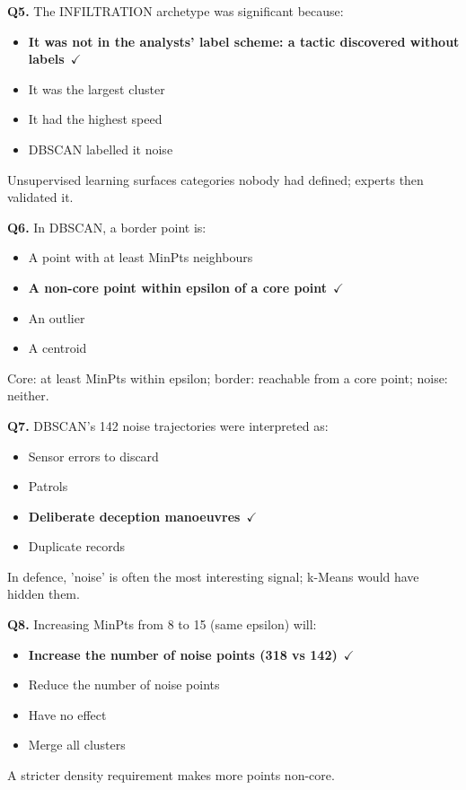 \documentclass[11pt]{article}
\begin{document}
{\noindent\textbf{Q5.} The INFILTRATION archetype was significant because:\begin{itemize}[leftmargin=2.2em,itemsep=0pt,topsep=1pt]\item[\textbf{A.}] \textbf{It was not in the analysts' label scheme: a tactic discovered without labels}~{\color{GrnN}$\checkmark$}\item[B.] It was the largest cluster\item[C.] It had the highest speed\item[D.] DBSCAN labelled it noise\end{itemize} Unsupervised learning surfaces categories nobody had defined; experts then validated it.\par\medskip

\noindent\textbf{Q6.} In DBSCAN, a border point is:\begin{itemize}[leftmargin=2.2em,itemsep=0pt,topsep=1pt]\item[A.] A point with at least MinPts neighbours\item[\textbf{B.}] \textbf{A non-core point within epsilon of a core point}~{\color{GrnN}$\checkmark$}\item[C.] An outlier\item[D.] A centroid\end{itemize} Core: at least MinPts within epsilon; border: reachable from a core point; noise: neither.\par\medskip

\noindent\textbf{Q7.} DBSCAN's 142 noise trajectories were interpreted as:\begin{itemize}[leftmargin=2.2em,itemsep=0pt,topsep=1pt]\item[A.] Sensor errors to discard\item[B.] Patrols\item[\textbf{C.}] \textbf{Deliberate deception manoeuvres}~{\color{GrnN}$\checkmark$}\item[D.] Duplicate records\end{itemize} In defence, 'noise' is often the most interesting signal; k-Means would have hidden them.\par\medskip

\noindent\textbf{Q8.} Increasing MinPts from 8 to 15 (same epsilon) will:\begin{itemize}[leftmargin=2.2em,itemsep=0pt,topsep=1pt]\item[\textbf{A.}] \textbf{Increase the number of noise points (318 vs 142)}~{\color{GrnN}$\checkmark$}\item[B.] Reduce the number of noise points\item[C.] Have no effect\item[D.] Merge all clusters\end{itemize} A stricter density requirement makes more points non-core.\par\medskip

}
\end{document}
